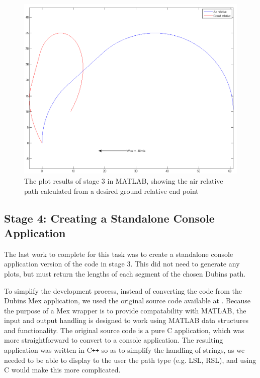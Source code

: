 \begin{figure}[htbp!] 
\centering    
\includegraphics[width=\textwidth]{PP3_Demo}
\caption[stage 3: Generating an Air Relative Path Based on Desired Ground Relative Destination in MATLAB]{The plot results of stage 3 in MATLAB, showing the air relative path calculated from a desired ground relative end point}
\label{fig:pp3demo}
\end{figure}


\subsection{Stage 4: Creating a Standalone Console Application}
\label{task1:implementation:stage4}

The last work to complete for this task was to create a standalone console application version of the code in stage 3. This did not need to generate any plots, but must return the lengths of each segment of the chosen Dubins path. 

To simplify the development process, instead of converting the code from the Dubins Mex application, we used the original source code available at \cite{WalkerDubinsCurves}. Because the purpose of a Mex wrapper is to provide compatability with MATLAB, the input and output handling is designed to work using MATLAB data structures and functionality. The original source code is a pure C application, which was more straightforward to convert to a console application. The resulting application was written in C\texttt{++} so as to simplify the handling of strings, as we needed to be able to display to the user the path type (e.g. LSL, RSL), and using C would make this more complicated. 

